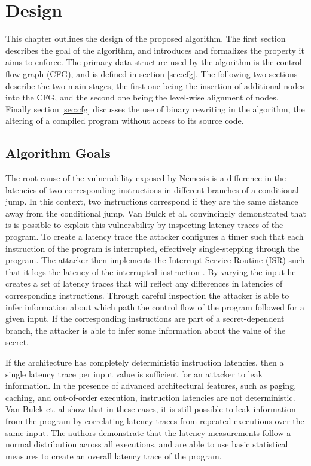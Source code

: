 \chapter{Design}
\label{cha:design}

This chapter outlines the design of the proposed algorithm.
The first section describes the goal of the algorithm, and introduces and formalizes the property it aims to enforce.
The primary data structure used by the algorithm is the control flow graph (CFG), and is defined in section \ref{sec:cfg}.
The following two sections describe the two main stages, the first one being the insertion of additional nodes into the CFG, and the second one being
the level-wise alignment of nodes. 
Finally section \ref{sec:cfg} discusses the use of binary rewriting in the algorithm, the altering of a compiled program without access to its source code. 


\section{Algorithm Goals}
\label{sec:goals}
The root cause of the vulnerability exposed by Nemesis is a difference in the latencies of two corresponding instructions in different branches of a 
conditional jump. 
In this context, two instructions correspond if they are the same distance away from the conditional jump. 
Van Bulck et al. \cite{Nemesis} convincingly demonstrated that is is possible to exploit this vulnerability by inspecting latency traces of the program.
To create a latency trace the attacker configures a timer such that each instruction of the program is interrupted, effectively single-stepping through the program. 
The attacker then implements the Interrupt Service Routine (ISR) such that it logs the latency of the interrupted instruction \cite{nemesisrepo, sancussupport}.
By varying the input he creates a set of latency traces that will reflect any differences in latencies of corresponding instructions.
Through careful inspection the attacker is able to infer information about which path the control flow of the program followed for a given input. 
If the corresponding instructions are part of a secret-dependent branch, the attacker is able to infer some information about the value of the secret. 

If the architecture has completely deterministic instruction latencies, then a single latency trace per input value is sufficient for an attacker to leak information.
In the presence of advanced architectural features, such as paging, caching, and out-of-order execution, instruction latencies are not deterministic. 
Van Bulck et. al \cite{Nemesis} show that in these cases, it is still possible to leak information from the program by correlating latency traces from repeated executions over the same input. 
The authors demonstrate that the latency measurements follow a normal distribution across all executions, and are able to use basic statistical measures to create an overall latency trace 
of the program. 
	

